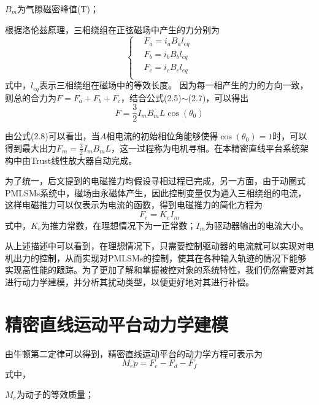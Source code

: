 $B_m$为气隙磁密峰值($\text{T}$)；

%

根据洛伦兹原理，三相绕组在正弦磁场中产生的力分别为
\begin{equation}
\left\{\begin{aligned}
&F_a=i_aB_al_{eq}\\ 
&F_b=i_bB_bl_{eq}\\ 
&F_c=i_cB_cl_{eq}\\
\end{aligned}\right.
\end{equation}
式中，$l_{eq}$表示三相绕组在磁场中的等效长度。
  因为每一相产生的力的方向一致，则总的合力为$F=F_a+F_b+F_c$，结合公式(2.5)$\sim$(2.7)，可以得出
\begin{equation}
F=\frac{3}{2}I_mB_mL\cos(\theta_0)
\end{equation}

由公式(2.8)可以看出，当$A$相电流的初始相位角能够使得$\cos(\theta_0)=1$时，可以得到最大出力$F_m=\frac{3}{2}I_mB_mL$，这一过程称为电机寻相。在本精密直线平台系统架构中由Trust线性放大器自动完成。

为了统一，后文提到的电磁推力均假设寻相过程已完成，另一方面，由于动圈式PMLSMs系统中，磁场由永磁体产生，因此控制变量仅为通入三相绕组的电流，这样电磁推力可以仅表示为电流的函数，得到电磁推力的简化方程为
\begin{equation}
F_e=K_eI_m
\end{equation}
式中，$K_e$为推力常数，在理想情况下为一正常数；$I_m$为驱动器输出的电流大小。

从上述描述中可以看到，在理想情况下，只需要控制驱动器的电流就可以实现对电机出力的控制，从而实现对PMLSMs的控制，使其在各种输入轨迹的情况下能够实现高性能的跟踪。为了更加了解和掌握被控对象的系统特性，我们仍然需要对其进行动力学建模，并分析其扰动类型，以便更好地对其进行补偿。
\section{精密直线运动平台动力学建模}
由牛顿第二定律可以得到，精密直线运动平台的动力学方程可表示为
\begin{equation}
M_e\ddot{p}={{F}_{e}}-{{F}_{d}}-{{F}_{f}} 
\end{equation}
式中，

$M_e$为动子的等效质量；

